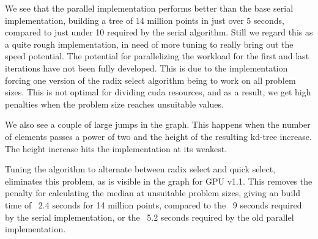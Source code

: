 




We see that the parallel implementation performs better than the base serial implementation, building a tree of 14 million points in just over 5 seconds, compared to just under 10 required by the serial algorithm. Still we regard this as a quite rough implementation, in need of more tuning to really bring out the speed potential. The potential for parallelizing the workload for the first and last iterations have not been fully developed. This is due to the implementation forcing one version of the radix select algorithm being to work on all problem sizes. This is not optimal for dividing cuda resources, and as a result, we get high penalties when the problem size reaches unsuitable values.

We also see a couple of large jumps in the graph. This happens when the number of elements passes a power of two and the height of the resulting kd-tree increase. The height increase hits the implementation at its weakest.

Tuning the algorithm to alternate between radix select and quick select, eliminates this problem, as is visible in the graph for GPU v1.1. This removes the penalty for calculating the median at unsuitable problem sizes, giving an build time of ~2.4 seconds for 14 million points, compared to the ~9 seconds required by the serial implementation, or the ~5.2 seconds required by the old parallel implementation.


